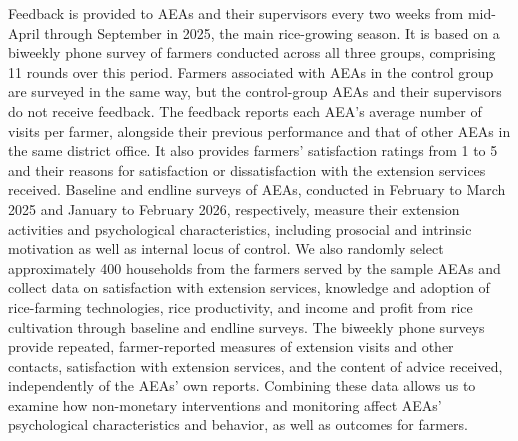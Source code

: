 \documentclass[11pt]{article}
\begin{document}
Feedback is provided to AEAs and their supervisors every two weeks from mid-April through September in 2025, the main rice-growing season. It is based on a biweekly phone survey of farmers conducted across all three groups, comprising 11 rounds over this period. Farmers associated with AEAs in the control group are surveyed in the same way, but the control-group AEAs and their supervisors do not receive feedback. The feedback reports each AEA's average number of visits per farmer, alongside their previous performance and that of other AEAs in the same district office. It also provides farmers' satisfaction ratings from 1 to 5 and their reasons for satisfaction or dissatisfaction with the extension services received. Baseline and endline surveys of AEAs, conducted in February to March 2025 and January to February 2026, respectively, measure their extension activities and psychological characteristics, including prosocial and intrinsic motivation as well as internal locus of control. We also randomly select approximately 400 households from the farmers served by the sample AEAs and collect data on satisfaction with extension services, knowledge and adoption of rice-farming technologies, rice productivity, and income and profit from rice cultivation through baseline and endline surveys. The biweekly phone surveys provide repeated, farmer-reported measures of extension visits and other contacts, satisfaction with extension services, and the content of advice received, independently of the AEAs' own reports. Combining these data allows us to examine how non-monetary interventions and monitoring affect AEAs' psychological characteristics and behavior, as well as outcomes for farmers.
\end{document}
